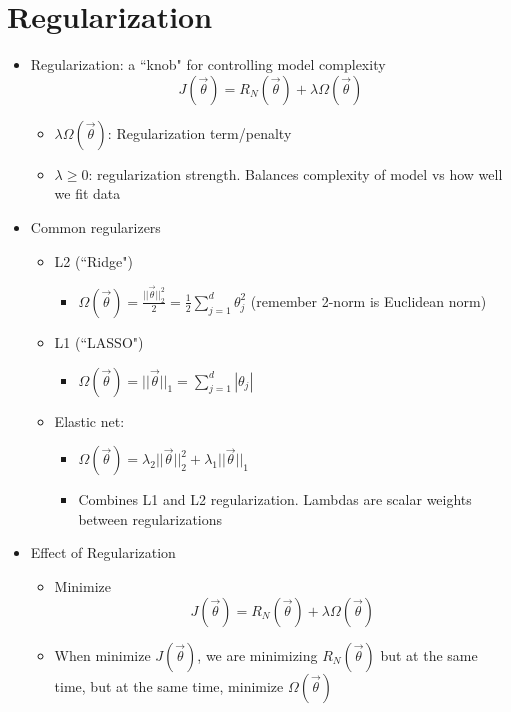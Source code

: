 \documentclass[10pt, oneside]{article}
\begin{document}
\section{Regularization}
\begin{itemize}
    \item Regularization: a ``knob" for controlling model complexity
    $$J(\vec \theta) = R_N(\vec \theta) + \lambda \Omega (\vec \theta)$$
    \begin{itemize}
        \item $\lambda \Omega (\vec \theta)$: Regularization term/penalty
        \item $\lambda \geq 0$: regularization strength. Balances complexity of model vs how well we fit data
    \end{itemize}
    \item Common regularizers
    \begin{itemize}
        \item L2 (``Ridge")
        \begin{itemize}
            \item $\Omega(\vec \theta) = \frac{||\vec \theta||_2^2}{2} = \frac{1}{2}\sum_{j=1} ^d \theta _j ^2$ (remember 2-norm is Euclidean norm)
        \end{itemize}
        \item L1 (``LASSO")
        \begin{itemize}
            \item $\Omega(\vec \theta) = ||\vec \theta||_1 = \sum_{j=1}^d |\theta_j|$
        \end{itemize}
        \item Elastic net:
        \begin{itemize}
            \item $\Omega(\vec \theta) = \lambda_2 ||\vec \theta||_2 ^2 + \lambda_1 ||\vec \theta||_1$
            \item Combines L1 and L2 regularization. Lambdas are scalar weights between regularizations
        \end{itemize}
    \end{itemize}
    \item Effect of Regularization
    \begin{itemize}
        \item Minimize $$J(\vec \theta) = R_N(\vec \theta) + \lambda \Omega (\vec \theta)$$
        \item When minimize $J(\vec \theta)$, we are minimizing $R_N(\vec \theta)$ but at the same time, but at the same time, minimize $\Omega(\vec \theta)$

\end{itemize}
\end{itemize}
\end{document}
